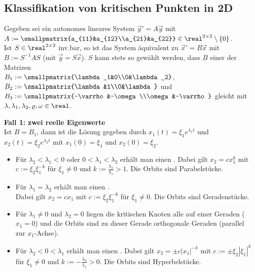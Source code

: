 \pagebreak

\subsection{%
    Klassifikation von kritischen Punkten in 2D%
}

Gegeben sei ein autonomes lineares System $\vec{y}' = A\vec{y}$ mit
$A := \smallpmatrix{a_{11}&a_{12}\\a_{21}&a_{22}} \in \real^{2 \times 2} \setminus \{0\}$.\\
Ist $S \in \real^{2 \times 2}$ inv.bar, so ist das System äquivalent zu
$\vec{x}' = B\vec{x}$ mit $B := S^{-1} AS$ (mit $\vec{y} = S\vec{x}$).
$S$ kann stets so gewählt werden, dass $B$ einer der Matrizen\\
$B_1 := \smallpmatrix{\lambda_1&0\\0&\lambda_2}$,
$B_2 := \smallpmatrix{\lambda&1\\0&\lambda}$ und
$B_3 := \smallpmatrix{-\varrho&-\omega\\\omega&-\varrho}$
gleicht mit $\lambda, \lambda_1, \lambda_2, \varrho, \omega \in \real$.

\textbf{Fall 1: zwei reelle Eigenwerte}\\
Ist $B = B_1$, dann ist die Lösung gegeben durch $x_1(t) = \xi_1 e^{\lambda_1 t}$ und
$x_2(t) = \xi_2 e^{\lambda_2 t}$ mit $x_1(0) = \xi_1$ und $x_2(0) = \xi_2$.
\begin{itemize}
    \item
    Für $\lambda_2 < \lambda_1 < 0$ oder $0 < \lambda_1 < \lambda_2$
    erhält man einen .
    Dabei gilt $x_2 = cx_1^k$ mit
    $c := \xi_2 \xi_1^{-k}$ für $\xi_1 \not= 0$
    und $k := \frac{\lambda_2}{\lambda_1} > 1$.
    Die Orbits sind Parabelstücke.
    
    \item
    Für $\lambda_1 = \lambda_2$ erhält man einen
    .\\
    Dabei gilt $x_2 = cx_1$ mit $c := \xi_2 \xi_1^{-k}$ für $\xi_1 \not= 0$.
    Die Orbits sind Geradenstücke.
    
    \item
    Für $\lambda_1 \not= 0$ und $\lambda_2 = 0$ liegen die kritischen Knoten alle auf
    einer Geraden ($x_1 = 0$) und die Orbits sind zu dieser Gerade orthogonale Geraden
    (parallel zur $x_1$-Achse).
    
    \item
    Für $\lambda_2 < 0 < \lambda_1$ erhält man einen .
    Dabei gilt $x_2 = \pm c|x_1|^{-k}$ mit
    $c := \pm\xi_2 |\xi_1|^k$ für $\xi_1 \not= 0$
    und $k := -\frac{\lambda_2}{\lambda_1} > 0$.
    Die Orbits sind Hyperbelstücke.
\end{itemize}

